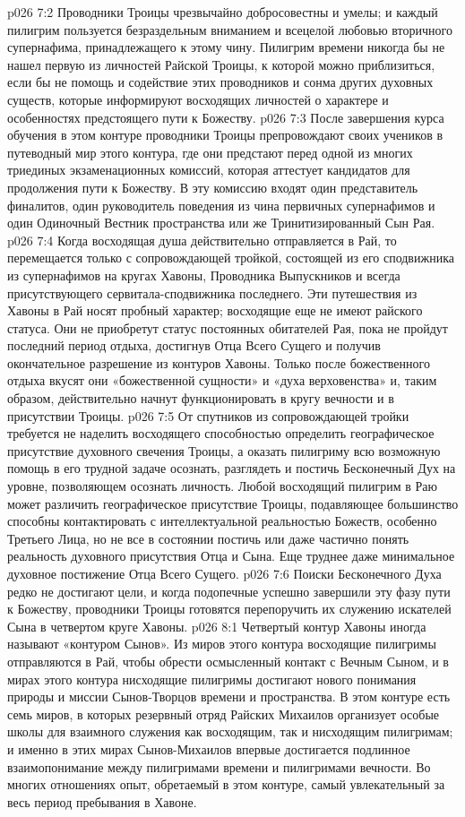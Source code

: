 \vs p026 7:2 Проводники Троицы чрезвычайно добросовестны и умелы; и каждый пилигрим пользуется безраздельным вниманием и всецелой любовью вторичного супернафима, принадлежащего к этому чину. Пилигрим времени никогда бы не нашел первую из личностей Райской Троицы, к которой можно приблизиться, если бы не помощь и содействие этих проводников и сонма других духовных существ, которые информируют восходящих личностей о характере и особенностях предстоящего пути к Божеству.
\vs p026 7:3 После завершения курса обучения в этом контуре проводники Троицы препровождают своих учеников в путеводный мир этого контура, где они предстают перед одной из многих триединых экзаменационных комиссий, которая аттестует кандидатов для продолжения пути к Божеству. В эту комиссию входят один представитель финалитов, один руководитель поведения из чина первичных супернафимов и один Одиночный Вестник пространства или же Тринитизированный Сын Рая.
\vs p026 7:4 Когда восходящая душа действительно отправляется в Рай, то перемещается только с сопровождающей тройкой, состоящей из его сподвижника из супернафимов на кругах Хавоны, Проводника Выпускников и всегда присутствующего сервитала\hyp{}сподвижника последнего. Эти путешествия из Хавоны в Рай носят пробный характер; восходящие еще не имеют райского статуса. Они не приобретут статус постоянных обитателей Рая, пока не пройдут последний период отдыха, достигнув Отца Всего Сущего и получив окончательное разрешение из контуров Хавоны. Только после божественного отдыха вкусят они «божественной сущности» и «духа верховенства» и, таким образом, действительно начнут функционировать в кругу вечности и в присутствии Троицы.
\vs p026 7:5 \pc От спутников из сопровождающей тройки требуется не наделить восходящего способностью определить географическое присутствие духовного свечения Троицы, а оказать пилигриму всю возможную помощь в его трудной задаче осознать, разглядеть и постичь Бесконечный Дух на уровне, позволяющем осознать личность. Любой восходящий пилигрим в Раю может различить географическое присутствие Троицы, подавляющее большинство способны контактировать с интеллектуальной реальностью Божеств, особенно Третьего Лица, но не все в состоянии постичь или даже частично понять реальность духовного присутствия Отца и Сына. Еще труднее даже минимальное духовное постижение Отца Всего Сущего.
\vs p026 7:6 Поиски Бесконечного Духа редко не достигают цели, и когда подопечные успешно завершили эту фазу пути к Божеству, проводники Троицы готовятся перепоручить их служению искателей Сына в четвертом круге Хавоны.
\vs p026 8:1 Четвертый контур Хавоны иногда называют «контуром Сынов». Из миров этого контура восходящие пилигримы отправляются в Рай, чтобы обрести осмысленный контакт с Вечным Сыном, и в мирах этого контура нисходящие пилигримы достигают нового понимания природы и миссии Сынов\hyp{}Творцов времени и пространства. В этом контуре есть семь миров, в которых резервный отряд Райских Михаилов организует особые школы для взаимного служения как восходящим, так и нисходящим пилигримам; и именно в этих мирах Сынов\hyp{}Михаилов впервые достигается подлинное взаимопонимание между пилигримами времени и пилигримами вечности. Во многих отношениях опыт, обретаемый в этом контуре, самый увлекательный за весь период пребывания в Хавоне.
